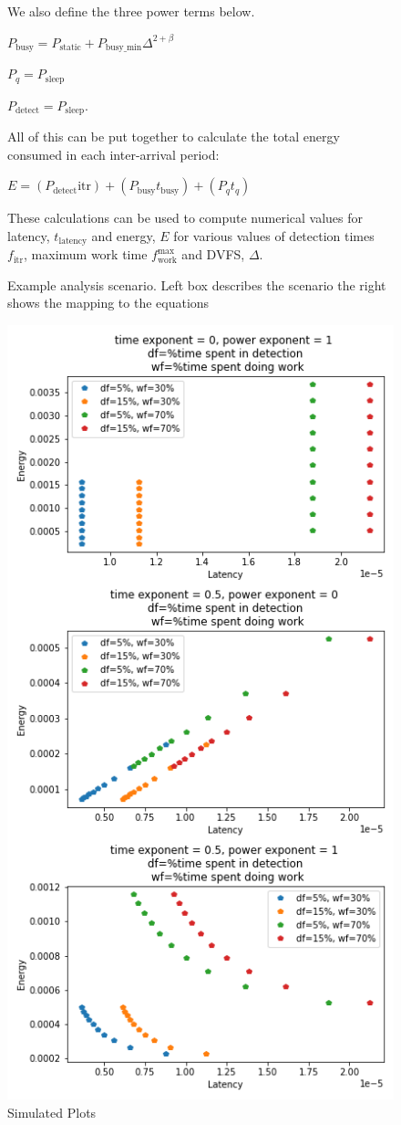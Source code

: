 \begin{figure}
{{\begin{minipage}{20em}
We also define the three power terms below.

$P_{\text{busy}} = P_{\text{static}} + P_{\text{busy\_min}} \Delta^{2+\beta}$


$P_q = P_{\text{sleep}}$

$P_{\text{detect}} = P_{\text{sleep}}$.

All of this can be put together to calculate the total energy consumed in each inter-arrival period:

$E = (P_{\text{detect}} \text{itr}) + (P_{\text{busy}} t_{\text{busy}}) + (P_q t_q)$

These calculations can be used to compute numerical values for latency, $t_{\text{latency}}$ and energy, $E$ for various values of detection times $f_{\text{itr}}$, maximum work time $f_{\text{work}}^{\text{max}}$ and DVFS, $\Delta$.
\end{minipage}
}
}
\caption[]{Example analysis scenario. Left box describes the scenario the right shows the mapping to the equations }
\label{fig:scenario}
\end{figure}

   


\begin{figure}
\centering
\includegraphics[width=.8\columnwidth]{figures/model_plots}
\caption[]{Simulated Plots}
\label{fig:simplots}
\vspace{-0.28in}
\end{figure}

